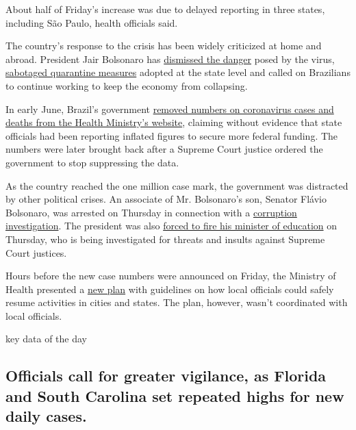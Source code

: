 About half of Friday's increase was due to delayed reporting in three
states, including São Paulo, health officials said.

The country's response to the crisis has been widely criticized at home
and abroad. President Jair Bolsonaro has
\href{https://www.nytimes.com/2020/04/01/world/americas/brazil-bolsonaro-coronavirus.html}{dismissed
the danger} posed by the virus,
\href{https://www.nytimes.com/2020/05/16/world/americas/virus-brazil-deaths.html}{sabotaged
quarantine measures} adopted at the state level and called on Brazilians
to continue working to keep the economy from collapsing.

In early June, Brazil's government
\href{https://www.nytimes.com/2020/06/06/world/coronavirus-update-us-usa.html\#link-3cfab740}{removed
numbers on coronavirus cases and deaths from the Health Ministry's
website}, claiming without evidence that state officials had been
reporting inflated figures to secure more federal funding. The numbers
were later brought back after a Supreme Court justice ordered the
government to stop suppressing the data.

As the country reached the one million case mark, the government was
distracted by other political crises. An associate of Mr. Bolsonaro's
son, Senator Flávio Bolsonaro, was arrested on Thursday in connection
with a
\href{https://www.nytimes.com/aponline/2020/06/18/world/americas/ap-lt-brazil-corruption-probe.html}{corruption
investigation}. The president was also
\href{https://www.nytimes.com/aponline/2020/06/18/world/americas/ap-lt-brazil-cabinet-minister-resigns.html}{forced
to fire his minister of education} on Thursday, who is being
investigated for threats and insults against Supreme Court justices.

Hours before the new case numbers were announced on Friday, the Ministry
of Health presented a
\href{https://www1.folha.uol.com.br/equilibrioesaude/2020/06/ministerio-da-saude-divulga-orientacoes-para-retomada-segura-de-atividades-saiba-quais.shtml?utm_source=twitter\&utm_medium=social\&utm_campaign=twfolha}{new
plan} with guidelines on how local officials could safely resume
activities in cities and states. The plan, however, wasn't coordinated
with local officials.

key data of the day

\hypertarget{officials-call-for-greater-vigilance-as-florida-and-south-carolina-set-repeated-highs-for-new-daily-cases}{%
\subsection{Officials call for greater vigilance, as Florida and South
Carolina set repeated highs for new daily
cases.}\label{officials-call-for-greater-vigilance-as-florida-and-south-carolina-set-repeated-highs-for-new-daily-cases}}


